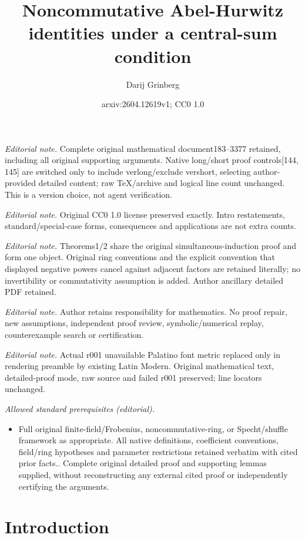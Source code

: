 \documentclass[numbers=enddot,12pt,final,onecolumn,notitlepage]{scrartcl}%
\title{Noncommutative Abel-Hurwitz identities under a central-sum condition}
\author{Darij Grinberg}
\date{arxiv:2604.12619v1; CC0 1.0}
\theoremstyle{definition}
\begin{document}
\maketitle
\noindent\textit{Editorial note.} Complete original mathematical document183--3377 retained, including all original supporting arguments. Native long/short proof controls[144, 145] are switched only to include verlong/exclude vershort, selecting author-provided detailed content; raw TeX/archive and logical line count unchanged. This is a version choice, not agent verification.\par\medskip
\noindent\textit{Editorial note.} Original CC0 1.0 license preserved exactly. Intro restatements, standard/special-case forms, consequences and applications are not extra counts.\par\medskip
\noindent\textit{Editorial note.} Theorems1/2 share the original simultaneous-induction proof and form one object. Original ring conventions and the explicit convention that displayed negative powers cancel against adjacent factors are retained literally; no invertibility or commutativity assumption is added. Author ancillary detailed PDF retained.\par\medskip
\noindent\textit{Editorial note.} Author retains responsibility for mathematics. No proof repair, new assumptions, independent proof review, symbolic/numerical replay, counterexample search or certification.\par\medskip
\noindent\textit{Editorial note.} Actual r001 unavailable Palatino font metric replaced only in rendering preamble by existing Latin Modern. Original mathematical text, detailed-proof mode, raw source and failed r001 preserved; line locators unchanged.\par\medskip
\noindent\textit{Allowed standard prerequisites (editorial).}\begin{itemize}
\item Full original finite-field/Frobenius, noncommutative-ring, or Specht/shuffle framework as appropriate. All native definitions, coefficient conventions, field/ring hypotheses and parameter restrictions retained verbatim with cited prior facts.. Complete original detailed proof and supporting lemmas supplied, without reconstructing any external cited proof or independently certifying the arguments.
\end{itemize}\medskip
\section{Introduction}
\end{document}
